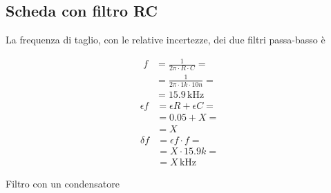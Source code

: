 \documentclass[a4paper]{article}
\begin{document}
		\subsection{Scheda con filtro RC}
			La frequenza di taglio, con le relative incertezze, dei due filtri passa-basso è
			\newline
			\begin{minipage}[t]{0.5\textwidth}
				\centering
				\begin{equation*}
					\begin{split}
						f &= \frac{1}{2 \pi \cdot R \cdot C} = \\
						  &= \frac{1}{2 \pi \cdot 1k \cdot 10n} = \\
						  &= 15.9 \, \mathrm{kHz}
					\end{split}
				\end{equation*}
				\newline
				\begin{equation*}
					\begin{split}
						\epsilon f &= \epsilon R + \epsilon C = \\
								   &= 0.05 + X = \\
								   &= X
					\end{split}
				\end{equation*}
				\newline
				\begin{equation*}
					\begin{split}
						\delta f &= \epsilon f \cdot f = \\
								 &= X \cdot 15.9k = \\
								 &= X \, \mathrm{kHz}
					\end{split}
				\end{equation*}
				\newline
				\begin{scriptsize}
					Filtro con un condensatore
				\end{scriptsize}
			\end{minipage}
\end{document}
